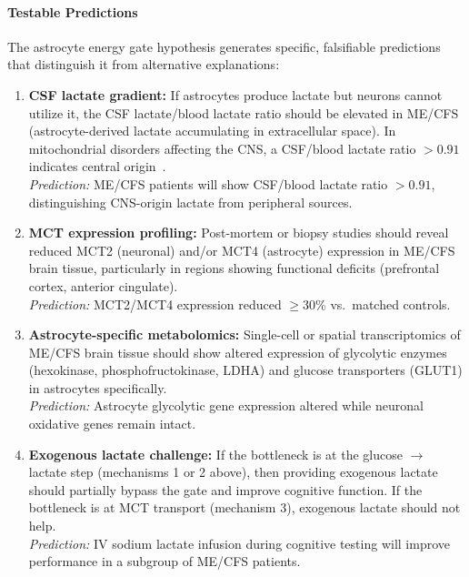 \paragraph{Testable Predictions}

The astrocyte energy gate hypothesis generates specific, falsifiable predictions that distinguish it from alternative explanations:

\begin{enumerate}
    \item \textbf{CSF lactate gradient:} If astrocytes produce lactate but neurons cannot utilize it, the CSF lactate/blood lactate ratio should be elevated in ME/CFS (astrocyte-derived lactate accumulating in extracellular space). In mitochondrial disorders affecting the CNS, a CSF/blood lactate ratio $> 0.91$ indicates central origin~\cite{Syed2025}. \\
    \emph{Prediction:} ME/CFS patients will show CSF/blood lactate ratio $> 0.91$, distinguishing CNS-origin lactate from peripheral sources.

    \item \textbf{MCT expression profiling:} Post-mortem or biopsy studies should reveal reduced MCT2 (neuronal) and/or MCT4 (astrocyte) expression in ME/CFS brain tissue, particularly in regions showing functional deficits (prefrontal cortex, anterior cingulate). \\
    \emph{Prediction:} MCT2/MCT4 expression reduced $\geq$30\% vs.\ matched controls.

    \item \textbf{Astrocyte-specific metabolomics:} Single-cell or spatial transcriptomics of ME/CFS brain tissue should show altered expression of glycolytic enzymes (hexokinase, phosphofructokinase, LDHA) and glucose transporters (GLUT1) in astrocytes specifically. \\
    \emph{Prediction:} Astrocyte glycolytic gene expression altered while neuronal oxidative genes remain intact.

    \item \textbf{Exogenous lactate challenge:} If the bottleneck is at the glucose $\to$ lactate step (mechanisms 1 or 2 above), then providing exogenous lactate should partially bypass the gate and improve cognitive function. If the bottleneck is at MCT transport (mechanism 3), exogenous lactate should not help. \\
    \emph{Prediction:} IV sodium lactate infusion during cognitive testing will improve performance in a subgroup of ME/CFS patients.


\end{enumerate}
